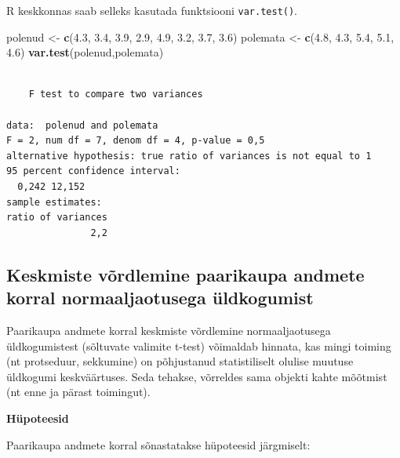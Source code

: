 \documentclass[
]{book}
\newenvironment{Shaded}{\begin{snugshade}}{\end{snugshade}}
\newcommand{\FloatTok}[1]{\textcolor[rgb]{0.00,0.00,0.81}{#1}}
\newcommand{\FunctionTok}[1]{\textcolor[rgb]{0.13,0.29,0.53}{\textbf{#1}}}
\newcommand{\NormalTok}[1]{#1}
\newcommand{\OtherTok}[1]{\textcolor[rgb]{0.56,0.35,0.01}{#1}}
\renewenvironment{Shaded} {\begin{snugshade}\footnotesize} {\end{snugshade}}
\theoremstyle{definition}
\theoremstyle{definition}
\theoremstyle{definition}
\theoremstyle{definition}
\theoremstyle{remark}
\begin{document}
R keskkonnas saab selleks kasutada funktsiooni \texttt{var.test()}.

\begin{Shaded}
\begin{Highlighting}[]
\NormalTok{polenud }\OtherTok{\textless{}{-}} \FunctionTok{c}\NormalTok{(}\FloatTok{4.3}\NormalTok{, }\FloatTok{3.4}\NormalTok{, }\FloatTok{3.9}\NormalTok{, }\FloatTok{2.9}\NormalTok{, }\FloatTok{4.9}\NormalTok{, }\FloatTok{3.2}\NormalTok{, }\FloatTok{3.7}\NormalTok{, }\FloatTok{3.6}\NormalTok{)}
\NormalTok{polemata }\OtherTok{\textless{}{-}} \FunctionTok{c}\NormalTok{(}\FloatTok{4.8}\NormalTok{, }\FloatTok{4.3}\NormalTok{, }\FloatTok{5.4}\NormalTok{, }\FloatTok{5.1}\NormalTok{, }\FloatTok{4.6}\NormalTok{)}
\FunctionTok{var.test}\NormalTok{(polenud,polemata)}
\end{Highlighting}
\end{Shaded}

\begin{verbatim}

    F test to compare two variances

data:  polenud and polemata
F = 2, num df = 7, denom df = 4, p-value = 0,5
alternative hypothesis: true ratio of variances is not equal to 1
95 percent confidence interval:
  0,242 12,152
sample estimates:
ratio of variances 
               2,2 
\end{verbatim}

\subsection{Keskmiste võrdlemine paarikaupa andmete korral normaaljaotusega üldkogumist}\label{keskmiste-vuxf5rdlemine-paarikaupa-andmete-korral-normaaljaotusega-uxfcldkogumist}

Paarikaupa andmete korral keskmiste võrdlemine normaaljaotusega üldkogumistest (sõltuvate valimite t-test) võimaldab hinnata, kas mingi toiming (nt protseduur, sekkumine) on põhjustanud statistiliselt olulise muutuse üldkogumi keskväärtuses. Seda tehakse, võrreldes sama objekti kahte mõõtmist (nt enne ja pärast toimingut).

\textbf{Hüpoteesid}

Paarikaupa andmete korral sõnastatakse hüpoteesid järgmiselt:
\end{document}
